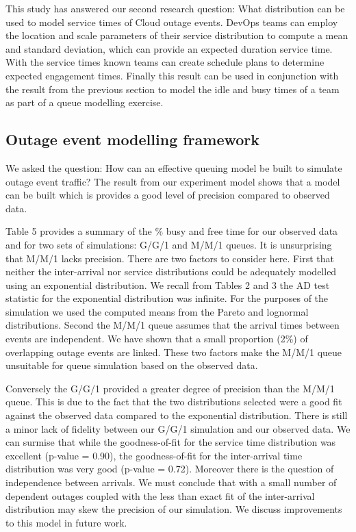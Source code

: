 \documentclass[5p]{elsarticle}
\begin{document}
This study has answered our second research question: What distribution can be used to model service times of Cloud outage events. DevOps teams can employ the location and scale parameters of their service distribution to compute a mean and standard deviation, which can provide an expected duration service time. With the service times known teams can create schedule plans to determine expected engagement times. Finally this result can be used in conjunction with the result from the previous section to model the idle and busy times of a team as part of a queue modelling exercise.


\subsection{Outage event modelling framework}

We asked the question: How can an effective queuing model be built to simulate outage event traffic? The result from our experiment model shows that a model can be built which is provides a good level of precision compared to observed data.

Table 5 provides a summary of the \% busy and free time for our observed data and for two sets of simulations: G/G/1 and M/M/1 queues. It is unsurprising that M/M/1 lacks precision. There are two factors to consider here. First that neither the inter-arrival nor service distributions could be adequately modelled using an exponential distribution. We recall from Tables 2 and 3 the AD test statistic for the exponential distribution was infinite. For the purposes of the simulation we used the computed means from the Pareto and lognormal distributions. Second the M/M/1 queue assumes that the arrival times between events are independent. We have shown that a small proportion (2\%) of overlapping outage events are linked. These two factors make the M/M/1 queue unsuitable for queue simulation based on the observed data.

Conversely the G/G/1 provided a greater degree of precision than the M/M/1 queue. This is due to the fact that the two distributions selected were a good fit against the observed data compared to the exponential distribution. There is still a minor lack of fidelity between our G/G/1 simulation and our observed data. We can surmise that while the goodness-of-fit for the service time distribution 
was excellent (p-value = 0.90), the goodness-of-fit for the inter-arrival time distribution was very good (p-value = 0.72). Moreover there is the question of independence between arrivals. We must conclude that with a small number of dependent outages coupled with the less than exact fit of the inter-arrival distribution may skew the precision of our simulation. We discuss improvements to this model in future work.
\end{document}
